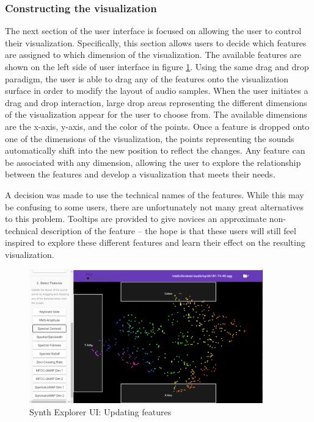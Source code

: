 \subsubsection{Constructing the visualization}
The next section of the user interface is focused on allowing the user to control their visualization. Specifically, this section allows users to decide which features are assigned to which dimension of the visualization. The available features are shown on the left side of user interface in figure \ref{fig:features}. Using the same drag and drop paradigm, the user is able to drag any of the features onto the visualization surface in order to modify the layout of audio samples. When the user initiates a drag and drop interaction, large drop areas representing the different dimensions of the visualization appear for the user to choose from. The available dimensions are the x-axis, y-axis, and the color of the points. Once a feature is dropped onto one of the dimensions of the visualization, the points representing the sounds automatically shift into the new position to reflect the changes. Any feature can be associated with any dimension, allowing the user to explore the relationship between the features and develop a visualization that meets their needs.

A decision was made to use the technical names of the features. While this may be confusing to some users, there are unfortunately not many great alternatives to this problem. Tooltips are provided to give novices an approximate non-technical description of the feature -- the hope is that these users will still feel inspired to explore these different features and learn their effect on the resulting visualization.

\begin{figure}
    \centering
    \includegraphics[width=0.9\textwidth]{SynthExplore A.png}
    \caption{Synth Explorer UI: Updating features}
    \label{fig:features}
\end{figure}


